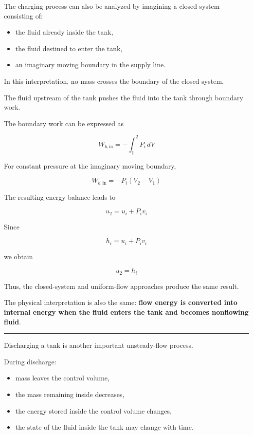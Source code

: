 \documentclass[12pt]{article}
\newcommand{\mysubsection}[2]{%
    \vspace{5px}
    \noindent{\headingfont\large #1\space #2\par}
    \vspace{4pt}
    \hrule
    \vspace{15pt}
}
\begin{document}
The charging process can also be analyzed by imagining a closed system consisting of:

\begin{itemize}
    \item the fluid already inside the tank,
    \item the fluid destined to enter the tank,
    \item an imaginary moving boundary in the supply line.
\end{itemize}

In this interpretation, no mass crosses the boundary of the closed system.

The fluid upstream of the tank pushes the fluid into the tank through boundary work.

The boundary work can be expressed as

\begin{equation}
W_{b,\mathrm{in}}
=
-\int_1^2 P_i\,dV
\end{equation}

For constant pressure at the imaginary moving boundary,

\begin{equation}
W_{b,\mathrm{in}}
=
-P_i(V_2-V_1)
\end{equation}

The resulting energy balance leads to

\begin{equation}
u_2
=
u_i+P_iv_i
\end{equation}

Since

\begin{equation}
h_i=u_i+P_iv_i
\end{equation}

we obtain

\begin{equation}
\boxed{
u_2=h_i
}
\end{equation}

Thus, the closed-system and uniform-flow approaches produce the same result.

The physical interpretation is also the same: \textbf{flow energy is converted into internal energy when the fluid enters the tank and becomes nonflowing fluid}.

\mysubsection{}{Discharging of a Tank}

Discharging a tank is another important unsteady-flow process.

During discharge:

\begin{itemize}
    \item mass leaves the control volume,
    \item the mass remaining inside decreases,
    \item the energy stored inside the control volume changes,
    \item the state of the fluid inside the tank may change with time.
\end{itemize}
\end{document}
